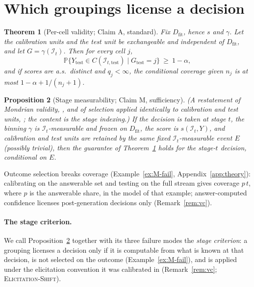 \documentclass[11pt]{article}
\newtheorem{theorem}{Theorem}
\newtheorem{proposition}[theorem]{Proposition}
\theoremstyle{definition}
\theoremstyle{remark}
\newcommand{\Dfit}{D_{\mathrm{fit}}}
\newcommand{\Info}{\mathcal{I}}
\renewcommand{\P}{\mathbb{P}}
\newcommand{\1}{\mathbf{1}}
\newcommand{\expname}[1]{\textsc{#1}}
\begin{document}
\section{Which groupings license a decision}
\label{sec:validity}

\begin{theorem}[Per-cell validity; Claim A, standard]
\label{thm:A}
Fix $\Dfit$, hence $s$ and $\gamma$. Let the calibration units and the test unit be
exchangeable and independent of $\Dfit$, and let $G=\gamma(\Info_t)$. Then for every
cell $j$,
\[
  \P\{Y_{\mathrm{test}} \in C(\Info_{t,\mathrm{test}}) \mid G_{\mathrm{test}} = j\} \ \ge\ 1-\alpha,
\]
and if scores are a.s.\ distinct and $q_j<\infty$, the conditional coverage given $n_j$
is at most $1-\alpha + 1/(n_j+1)$.
\end{theorem}


\begin{proposition}[Stage measurability; Claim M, sufficiency]
\label{prop:M-suff}
 (A restatement of Mondrian validity, \citealp{vovk2012conditional}, and of selection
applied identically to calibration and test units, \citealp[Thm.~1]{bao2024selective}; the content
is the stage indexing.) If the decision is taken at stage $t$, the binning $\gamma$ is
$\Info_t$-measurable and frozen on $\Dfit$, the score is $s(\Info_t,Y)$, and calibration and
test units are retained by the same fixed $\Info_t$-measurable event $E$ (possibly trivial),
then the guarantee of Theorem~\ref{thm:A} holds for the stage-$t$ decision, conditional on $E$.
\end{proposition}


Outcome selection breaks coverage (Example~\ref{ex:M-fail}, Appendix~\ref{app:theory}): calibrating on the
answerable set and testing on the full stream gives coverage $p\,t$, where $p$ is the answerable share,
in the model of that example; answer-computed confidence licenses
post-generation decisions only (Remark~\ref{rem:vc}).


\paragraph{The stage criterion.} We call Proposition~\ref{prop:M-suff} together with its three
failure modes the \emph{stage criterion}: a grouping licenses a decision only if it is computable
from what is known at that decision, is not selected on the outcome (Example~\ref{ex:M-fail}),
and is applied under the elicitation convention it was calibrated in (Remark~\ref{rem:vc}; \expname{Elicitation-Shift}).
\end{document}

